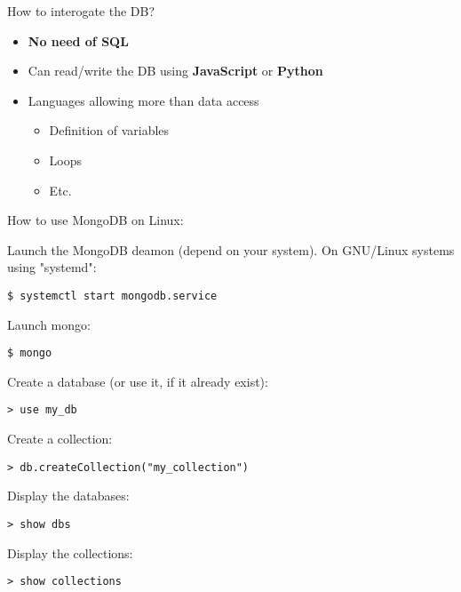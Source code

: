 \documentclass{beamer}[10pt, usepdftitle=false handout]
\begin{document}
	\begin{frame}
	
How to interogate the DB?
\vspace*{0.6em}

	\begin{itemize}
	\item{\textbf{No need of SQL}}
	\item{Can read/write the DB using \textbf{JavaScript} or \textbf{Python}}	
	\item{Languages allowing more than data access
		\begin{itemize}
			\item{Definition of variables}
			\item{Loops}
			\item{Etc.}	
		\end{itemize}			
	}
	
	\end{itemize}
	
	\end{frame}
	\begin{frame}[fragile]
	How to use MongoDB on Linux:
	\vspace*{0.6em}

Launch the MongoDB deamon (depend on your system).
On GNU/Linux systems using "systemd":
\begin{verbatim}
$ systemctl start mongodb.service
\end{verbatim}

Launch mongo:
\begin{verbatim}
$ mongo
\end{verbatim}

Create a database (or use it, if it already exist):
\begin{verbatim}
> use my_db
\end{verbatim}

Create a collection:
\begin{verbatim}
> db.createCollection("my_collection")
\end{verbatim}

Display the databases:
\begin{verbatim}
> show dbs
\end{verbatim}

Display the collections:

\begin{verbatim}
> show collections
\end{verbatim}
	
	\end{frame}
\end{document}
